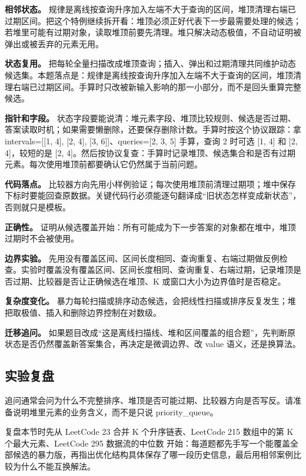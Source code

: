 \textbf{相邻状态。} 规律是离线按查询升序加入左端不大于查询的区间，堆顶清理右端已过期区间。把这个特例继续拆开看：堆顶必须正好代表下一步最需要处理的候选；若堆里可能有过期对象，读取堆顶前要先清理。堆只解决动态极值，不自动证明被弹出或被丢弃的元素无用。

\textbf{状态复用。} 把每轮全量扫描改成堆顶查询；插入、弹出和过期清理共同维护动态候选集。本题落点是：规律是离线按查询升序加入左端不大于查询的区间，堆顶清理右端已过期区间。手算时只改被新输入影响的那一小部分，而不是回头重算完整候选。

\textbf{指针和字段。} 状态字段要能说清：堆元素字段、堆顶比较规则、候选是否过期、答案读取时机；如果需要懒删除，还要保存删除计数。手算时按这个协议跟踪：拿 intervals=[[1, 4], [2, 4], [3, 6]]、queries=[2, 3, 5] 手算，查询 2 时可选 [1, 4] 和 [2, 4]，较短的是 [2, 4]。然后按协议复查：手算时记录堆顶、候选集合和是否有过期元素。每次使用堆顶前都要确认它仍然属于当前问题。

\textbf{代码落点。} 比较器方向先用小样例验证；每次使用堆顶前清理过期项；堆中保存下标时要能回查原数据。关键代码行必须能逐句翻译成“旧状态怎样变成新状态”，否则就只是模板。

\textbf{正确性。} 证明从候选覆盖开始：所有可能成为下一步答案的对象都在堆中，堆顶过期时不会被使用。

\textbf{边界实验。} 先用没有覆盖区间、区间长度相同、查询重复、右端过期做反例检查。实验时覆盖没有覆盖区间、区间长度相同、查询重复、右端过期，记录堆顶是否过期、比较器是否让正确候选在堆顶、K 或窗口大小为边界值时是否稳定。

\textbf{复杂度变化。} 暴力每轮扫描或排序动态候选，会把线性扫描或排序反复发生；堆把取极值、插入和删除边界控制在对数级。

\textbf{迁移追问。} 如果题目改成“这是离线扫描线、堆和区间覆盖的组合题”，先判断原状态是否仍然覆盖新答案集合，再决定是微调边界、改 value 语义，还是换算法。

\subsection{实验复盘}

追问通常会问为什么不完整排序、堆顶是否可能过期、比较器方向是否写反。请准备说明堆里元素的业务含义，而不是只说 priority\_queue。

复盘本节时先从 LeetCode 23 合并 K 个升序链表、LeetCode 215 数组中的第 K 个最大元素、LeetCode 295 数据流的中位数 开始：每道题都先手写一个能覆盖全部候选的暴力版，再指出优化结构具体保存了哪一段历史信息，最后用相邻案例比较为什么不能互换解法。
